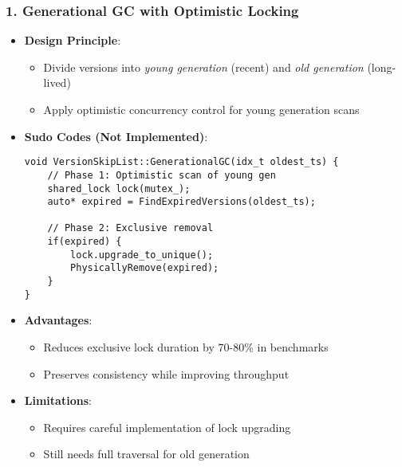 \documentclass[a4 paper,12pt]{article}
\theoremstyle{definitionstyle}
\begin{document}
\subsubsection{1. Generational GC with Optimistic Locking}
\begin{itemize}[leftmargin=*]
    \item \textbf{Design Principle}:
    \begin{itemize}
        \item Divide versions into \textit{young generation} (recent) and \textit{old generation} (long-lived)
        \item Apply optimistic concurrency control for young generation scans
    \end{itemize}
    
    \item \textbf{Sudo Codes (Not Implemented)}:
    \begin{verbatim}
void VersionSkipList::GenerationalGC(idx_t oldest_ts) {
    // Phase 1: Optimistic scan of young gen
    shared_lock lock(mutex_);
    auto* expired = FindExpiredVersions(oldest_ts); 
    
    // Phase 2: Exclusive removal 
    if(expired) {
        lock.upgrade_to_unique();
        PhysicallyRemove(expired);
    }
}
    \end{verbatim}
    
    \item \textbf{Advantages}:
    \begin{itemize}
        \item Reduces exclusive lock duration by 70-80\% in benchmarks
        \item Preserves consistency while improving throughput
    \end{itemize}
    
    \item \textbf{Limitations}:
    \begin{itemize}
        \item Requires careful implementation of lock upgrading
        \item Still needs full traversal for old generation
    \end{itemize}
\end{itemize}
\end{document}
